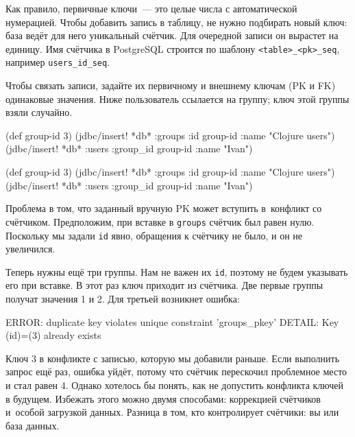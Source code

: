 
Как правило, первичные ключи~--- это целые числа с автоматической
нумерацией. Чтобы добавить запись в таблицу, не нужно подбирать новый ключ: база
ведёт для него уникальный счётчик. Для очередной записи он вырастет на
единицу. Имя счётчика в PostgreSQL строится по шаблону \verb|<table>_<pk>_seq|,
например \verb|users_id_seq|.

Чтобы связать записи, задайте их первичному и внешнему ключам (PK и FK)
одинаковые значения. Ниже пользователь ссылается на группу; ключ этой группы
взяли случайно.

\ifnarrow

\begin{english}
  \begin{clojure}
(def group-id 3)
(jdbc/insert! *db* :groups
  {:id group-id :name "Clojure users"})
(jdbc/insert! *db* :users
  {:group_id group-id :name "Ivan"})
  \end{clojure}
\end{english}

\else

\begin{english}
  \begin{clojure}
(def group-id 3)
(jdbc/insert! *db* :groups
   {:id group-id :name "Clojure users"})
(jdbc/insert! *db* :users
   {:group_id group-id :name "Ivan"})
  \end{clojure}
\end{english}

\fi

Проблема в том, что заданный вручную PK может вступить в~конфликт со
счётчиком. Предположим, при вставке в \verb|groups| счётчик был равен
нулю. Поскольку мы задали \verb|id| явно, обращения к счётчику не было, и он не
увеличился.

Теперь нужны ещё три группы. Нам не важен их \verb|id|, поэтому не будем
указывать его при вставке. В этот раз ключ приходит из счётчика. Две первые
группы получат значения 1 и 2. Для третьей возникнет ошибка:


\begin{english}
  \begin{text}
ERROR: duplicate key violates
       unique constraint 'groups_pkey'
DETAIL: Key (id)=(3) already exists
  \end{text}
\end{english}

Ключ 3 в конфликте с записью, которую мы добавили раньше. Если выполнить запрос
ещё раз, ошибка уйдёт, потому что счётчик перескочил проблемное место и стал
равен 4. Однако хотелось бы понять, как не допустить конфликта ключей в будущем.
Избежать этого можно двумя способами: коррекцией счётчиков и~особой загрузкой
данных. Разница в том, кто контролирует счётчики: вы или база данных.

